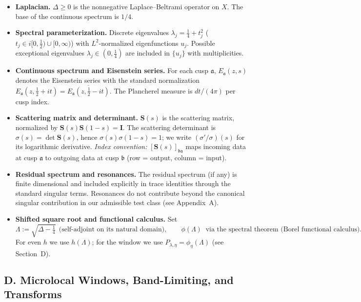 \begin{itemize}
  \item \textbf{Laplacian.} $\Delta\ge 0$ is the nonnegative Laplace--Beltrami operator on $X$. The base of the continuous spectrum is $1/4$.
  \item \textbf{Spectral parameterization.} Discrete eigenvalues $\lambda_j=\tfrac{1}{4}+t_j^2$ ($t_j\in i[0,\tfrac12)\cup[0,\infty)$) with $L^2$-normalized eigenfunctions $u_j$.
        Possible exceptional eigenvalues $\lambda_j\in(0,\tfrac14)$ are included in $\{u_j\}$ with multiplicities.
  \item \textbf{Continuous spectrum and Eisenstein series.} For each cusp $\mathfrak{a}$, $E_\mathfrak{a}(z,s)$ denotes the Eisenstein series with the standard normalization
        $E_\mathfrak{a}(z,\tfrac12+it)=\overline{E_\mathfrak{a}(z,\tfrac12-it)}$. The Plancherel measure is $dt/(4\pi)$ per cusp index.
  \item \textbf{Scattering matrix and determinant.} $\mathbf{S}(s)$ is the scattering matrix, normalized by $\mathbf{S}(s)\mathbf{S}(1-s)=\mathbf{I}$.
        The scattering determinant is $\sigma(s)=\det\mathbf{S}(s)$, hence $\sigma(s)\sigma(1-s)=1$; we write $(\sigma'/\sigma)(s)$ for its logarithmic derivative.
        \emph{Index convention:} $[\mathbf{S}(s)]_{\mathfrak{b}\mathfrak{a}}$ maps incoming data at cusp $\mathfrak{a}$ to outgoing data at cusp $\mathfrak{b}$ (row = output, column = input).
  \item \textbf{Residual spectrum and resonances.} The residual spectrum (if any) is finite dimensional and included explicitly in trace identities through the standard singular terms.
        Resonances do not contribute beyond the canonical singular contribution in our admissible test class (see Appendix~A).
  \item \textbf{Shifted square root and functional calculus.} Set
        \[
           \Lambda:=\sqrt{\Delta-\tfrac14}\ \ \text{(self-adjoint on its natural domain)},\qquad
           \phi(\Lambda)\ \text{ via the spectral theorem (Borel functional calculus)}.
        \]
        For even $h$ we use $h(\Lambda)$; for the window we use $P_{\lambda,\eta}=\phi_\eta(\Lambda)$ (see Section~D).
\end{itemize}

\subsection*{D. Microlocal Windows, Band-Limiting, and Transforms}

